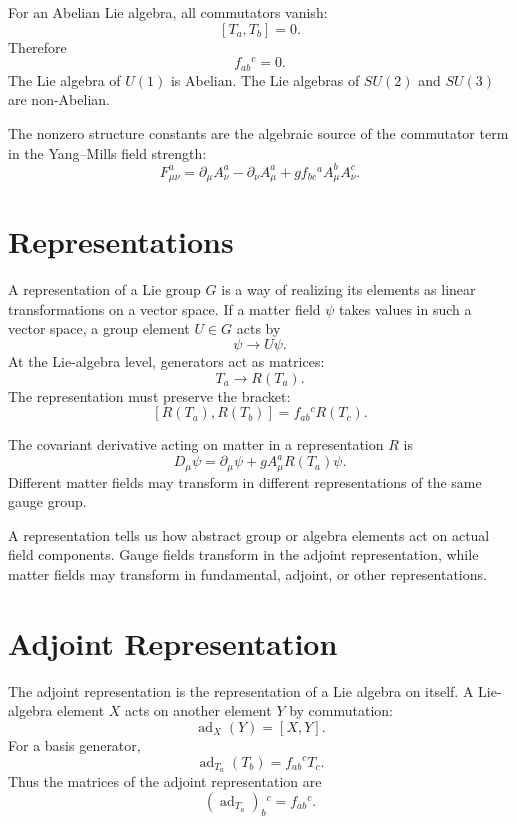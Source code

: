 For an Abelian Lie algebra, all commutators vanish:
\[
    [T_a,T_b]=0.
\]
Therefore
\[
    f_{ab}{}^c=0.
\]
The Lie algebra of \(U(1)\) is Abelian. The Lie algebras of \(SU(2)\) and
\(SU(3)\) are non-Abelian.

\begin{remarkbox}
The nonzero structure constants are the algebraic source of the commutator term
in the Yang--Mills field strength:
\[
    F_{\mu\nu}^a=\partial_\mu A_\nu^a-\partial_\nu A_\mu^a
    +g f_{bc}{}^a A_\mu^bA_\nu^c.
\]
\end{remarkbox}

\section{Representations}

A representation of a Lie group \(G\) is a way of realizing its elements as
linear transformations on a vector space. If a matter field \(\psi\) takes values
in such a vector space, a group element \(U\in G\) acts by
\[
    \psi\longrightarrow U\psi.
\]
At the Lie-algebra level, generators act as matrices:
\[
    T_a\longrightarrow R(T_a).
\]
The representation must preserve the bracket:
\[
    [R(T_a),R(T_b)]=f_{ab}{}^cR(T_c).
\]

The covariant derivative acting on matter in a representation \(R\) is
\[
    D_\mu\psi=\partial_\mu\psi+gA_\mu^aR(T_a)\psi.
\]
Different matter fields may transform in different representations of the same
gauge group.

\begin{definitionbox}
A representation tells us how abstract group or algebra elements act on actual
field components. Gauge fields transform in the adjoint representation, while
matter fields may transform in fundamental, adjoint, or other representations.
\end{definitionbox}

\section{Adjoint Representation}

The adjoint representation is the representation of a Lie algebra on itself. A
Lie-algebra element \(X\) acts on another element \(Y\) by commutation:
\[
    \operatorname{ad}_X(Y)=[X,Y].
\]
For a basis generator,
\[
    \operatorname{ad}_{T_a}(T_b)=f_{ab}{}^cT_c.
\]
Thus the matrices of the adjoint representation are
\[
    (\operatorname{ad}_{T_a})_b{}^c=f_{ab}{}^c.
\]

